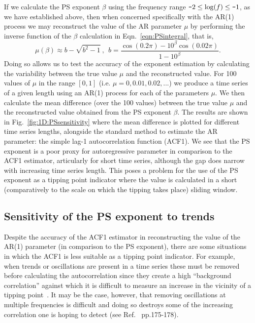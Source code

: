 \documentclass[10pt]{iopart}
\newcommand{\m}{\textup{\texttt{-}}}
\newcommand{\revision}[1]{}
\begin{document}
If we calculate the PS exponent $\beta$ using the frequency range $\m2\leq\log(f)\leq\m1$, as we have established above, then when concerned specifically with the AR(1) process we may reconstruct the value of the AR parameter $\mu$ by performing the inverse function of the $\beta$ calculation in Eqn.~\ref{eqn:PSintegral}, that is,
\begin{equation}
	\label{eqn:1D:PSindicator:reconstruct_mu_repro}
	\mu(\beta)\approx b-\sqrt{b^2-1}~, ~~ b = \frac{\cos(0.2\pi)-10^\beta \cos(0.02\pi)}{1-10^\beta}.
\end{equation}
Doing so allows us to test the accuracy of the exponent estimation by calculating the variability between the true value $\mu$ and the reconstructed value. For 100 values of $\mu$ in the range $[0,1]$ (i.e. $\mu = 0, 0.01, 0.02, ...$) we produce a time series of a given length using an AR(1) process for each of the parameters $\mu$. We then calculate the mean difference (over the 100 values) between the true value $\mu$ and the reconstructed value obtained from the PS exponent $\beta$. The results are shown in Fig.~\ref{fig:1D:PSsensitivity} where the mean difference is plotted for different time series lengths, alongside the standard method to estimate the AR parameter: the simple lag-1 autocorrelation function (ACF1). We see that the PS exponent is a poor proxy for autoregressive parameter in comparison to the ACF1 estimator, {\revision particularly} for short time series, although the gap does narrow with increasing time series length. This poses a problem for the use of the PS exponent as a tipping point indicator where the value is calculated in a short (comparatively to the scale on which the tipping takes place) sliding window. 


\subsection{Sensitivity of the PS exponent to trends}

Despite the accuracy of the ACF1 estimator in reconstructing the value of the AR(1) parameter (in comparison to the PS exponent), there are some situations in which the ACF1 is less suitable as a tipping point indicator. For example, when trends or oscillations are present in a time series these must be removed before calculating the autocorrelation since they create a high ``background correlation'' against which it is difficult to measure an increase in the vicinity of a tipping point~\cite{prettyman2019}. It may be the case, however, that removing oscillations at multiple frequencies is difficult and doing so destroys some of the increasing correlation one is hoping to detect (see Ref.~\cite{prettyman2021} pp.175-178). 
\end{document}
